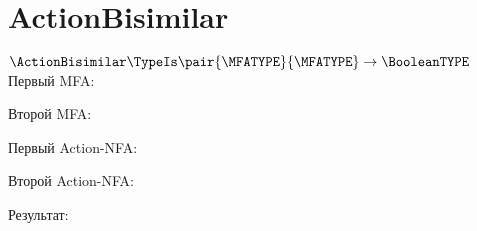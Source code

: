 \section{ActionBisimilar}
\begin{frame}{$\ActionBisimilar\TypeIs\pair{\MFATYPE}{\MFATYPE}\to\BooleanTYPE$}
	Первый MFA:


	Второй MFA:


    Первый Action-NFA:


    Второй Action-NFA:


	Результат:


\end{frame}